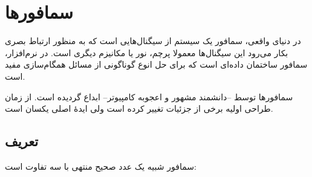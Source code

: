 \documentclass{book}
\newcommand{\clearemptydoublepage}{\newpage\cleardoublepage}
\begin{document}
\clearemptydoublepage
\chapter{سمافورها}

    در دنیای واقعی، سمافور یک سیستم از سیگنال‌هایی است که به منظور ارتباط بصری بکار می‌رود این سیگنال‌ها معمولا پرچم،‌ نور یا مکانیزم دیگری است. 
    در نرم‌افزار، سمافور ساختمان داده‌ای است که برای حل انوع گوناگونی از مسائل همگام‌سازی مفید است.

    سمافورها توسط  --دانشمند مشهور و اعجوبه کامپیوتر-- ابداع گردیده است. 
    از زمان طراحی اولیه برخی از جزئیات تغییر کرده است ولی ایدهٔ اصلی یکسان است. 

\section{تعریف}

    سمافور شبیه یک عدد صحیح منتهی با سه تفاوت است: 
\end{document}
